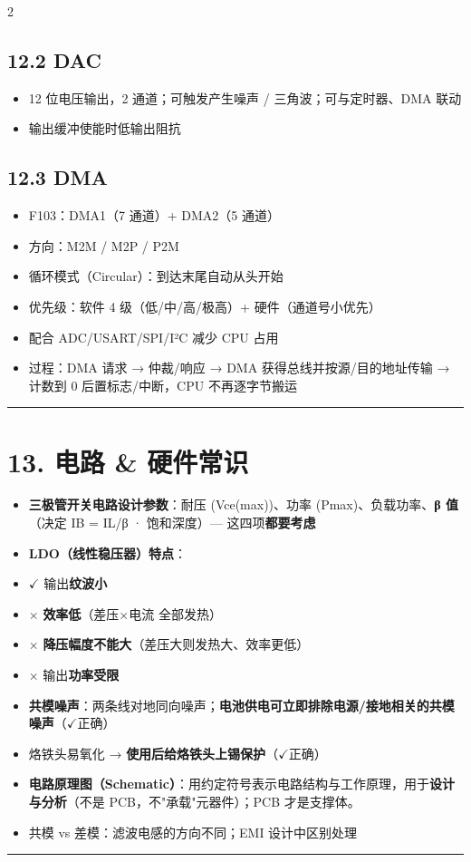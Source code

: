 \documentclass[UTF8,zihao=-5]{ctexart}
\newcommand{\okmark}{\ensuremath{\checkmark}}
\begin{document}
\begin{multicols*}{2}
\subsection*{12.2 DAC}
\begin{itemize}
\item 12 位电压输出，2 通道；可触发产生噪声 / 三角波；可与定时器、DMA 联动
\item 输出缓冲使能时低输出阻抗
\end{itemize}
\subsection*{12.3 DMA}
\begin{itemize}
\item F103：DMA1（7 通道）+ DMA2（5 通道）
\item 方向：M2M / M2P / P2M
\item 循环模式（Circular）：到达末尾自动从头开始
\item 优先级：软件 4 级（低/中/高/极高）+ 硬件（通道号小优先）
\item 配合 ADC/USART/SPI/I²C 减少 CPU 占用
\item 过程：DMA 请求 → 仲裁/响应 → DMA 获得总线并按源/目的地址传输 → 计数到 0 后置标志/中断，CPU 不再逐字节搬运
\end{itemize}
\vspace{1pt}\hrule\vspace{1pt}
\section*{13. 电路 \& 硬件常识}
\begin{itemize}
\item \textbf{三极管开关电路设计参数}：耐压 (Vce(max))、功率 (Pmax)、负载功率、\textbf{β 值}（决定 IB = IL/β · 饱和深度）— 这四项\textbf{都要考虑}
\item \textbf{LDO（线性稳压器）特点}：
\item $\checkmark$ 输出\textbf{纹波小}
\item $\times$ \textbf{效率低}（差压×电流 全部发热）
\item $\times$ \textbf{降压幅度不能大}（差压大则发热大、效率更低）
\item $\times$ 输出\textbf{功率受限}
\item \textbf{共模噪声}：两条线对地同向噪声；\textbf{电池供电可立即排除电源/接地相关的共模噪声}（\okmark 正确）
\item 烙铁头易氧化 → \textbf{使用后给烙铁头上锡保护}（\okmark 正确）
\item \textbf{电路原理图（Schematic）}：用约定符号表示电路结构与工作原理，用于\textbf{设计与分析}（不是 PCB，不"承载"元器件）；PCB 才是支撑体。
\item 共模 vs 差模：滤波电感的方向不同；EMI 设计中区别处理
\end{itemize}
\vspace{1pt}\hrule\vspace{1pt}

\end{multicols*}
\end{document}

